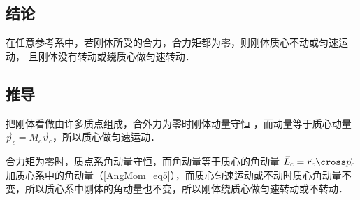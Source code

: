 
\subsection{结论}
在任意参考系中，若刚体所受的合力，合力矩都为零，则刚体质心不动或匀速运动， 且刚体没有转动或绕质心做匀速转动．

\subsection{推导}
把刚体看做由许多质点组成，合外力为零时刚体动量守恒%
，而动量等于质心动量
$\vec p_c = M_c \vec v_c$，所以质心做匀速运动．

合力矩为零时，质点系角动量守恒，而角动量等于质心的角动量 $\vec L_c =\vec r_c\cross\vec p_c$ 加质心系中的角动量（\autoref{AngMom_eq5}），而质心匀速运动或不动时质心角动量不变，所以质心系中刚体的角动量也不变，所以刚体绕质心做匀速转动或不转动．
